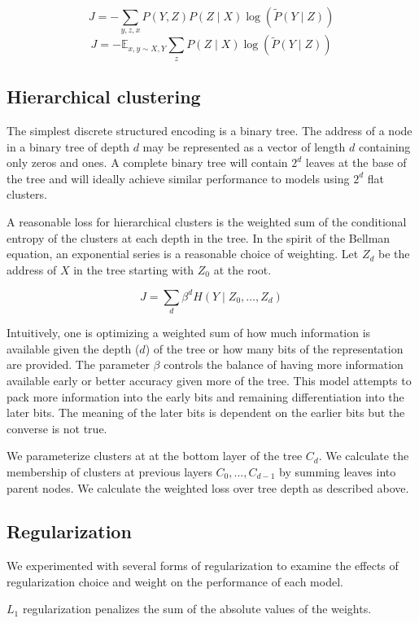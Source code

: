 \documentclass[11pt,letterpaper]{article}
\begin{document}
$$ J = - \sum_{y,z,x} P(Y, Z) P(Z \mid X) \log( \tilde{P}(Y \mid Z)) $$
$$ J = - \mathbb{E}_{x,y \sim X, Y} \sum_{z} P(Z \mid X) \log( \tilde{P}(Y \mid Z)) $$

\subsection{Hierarchical clustering}

The simplest discrete structured encoding is a binary tree. The address of a node in a binary tree of depth $d$ may be represented as a vector of length $d$ containing only zeros and ones. A complete binary tree will contain $2^d$ leaves at the base of the tree and will ideally achieve similar performance to models using $2^d$ flat clusters.

A reasonable loss for hierarchical clusters is the weighted sum of the conditional entropy of the clusters at each depth in the tree. In the spirit of the Bellman equation, an exponential series is a reasonable choice of weighting. Let $Z_d$ be the address of $X$ in the tree starting with $Z_0$ at the root.

$$ J = \sum_d \beta ^ d  H(Y \mid Z_0,\ldots, Z_d) $$

Intuitively, one is optimizing a weighted sum of how much information is available given the depth ($d$) of the tree or how many bits of the representation are provided. The parameter $\beta$ controls the balance of having more information available early or better accuracy given more of the tree. This model attempts to pack more information into the early bits and remaining differentiation into the later bits. The meaning of the later bits is dependent on the earlier bits but the converse is not true.

We parameterize clusters at at the bottom layer of the tree $C_d$. We calculate the membership of clusters at previous layers $C_0,...,C_{d-1}$ by summing leaves into parent nodes. We calculate the weighted loss over tree depth as described above.

\subsection{Regularization}

We experimented with several forms of regularization to examine the effects of regularization choice and weight on the performance of each model.

$L_1$ regularization penalizes the sum of the absolute values of the weights.
\end{document}
